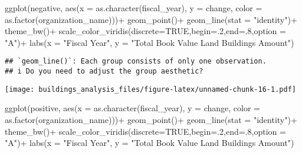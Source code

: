 \documentclass[
]{article}
\newenvironment{Shaded}{\begin{snugshade}}{\end{snugshade}}
\newcommand{\AttributeTok}[1]{\textcolor[rgb]{0.77,0.63,0.00}{#1}}
\newcommand{\ConstantTok}[1]{\textcolor[rgb]{0.00,0.00,0.00}{#1}}
\newcommand{\DecValTok}[1]{\textcolor[rgb]{0.00,0.00,0.81}{#1}}
\newcommand{\FunctionTok}[1]{\textcolor[rgb]{0.00,0.00,0.00}{#1}}
\newcommand{\NormalTok}[1]{#1}
\newcommand{\SpecialCharTok}[1]{\textcolor[rgb]{0.00,0.00,0.00}{#1}}
\newcommand{\StringTok}[1]{\textcolor[rgb]{0.31,0.60,0.02}{#1}}
\begin{document}
\begin{Shaded}
\begin{Highlighting}[]
  \FunctionTok{ggplot}\NormalTok{(negative, }\FunctionTok{aes}\NormalTok{(}\AttributeTok{x =} \FunctionTok{as.character}\NormalTok{(fiscal\_year), }\AttributeTok{y =}\NormalTok{ change, }\AttributeTok{color =} \FunctionTok{as.factor}\NormalTok{(organization\_name)))}\SpecialCharTok{+}
    \FunctionTok{geom\_point}\NormalTok{()}\SpecialCharTok{+}
    \FunctionTok{geom\_line}\NormalTok{(}\AttributeTok{stat =} \StringTok{"identity"}\NormalTok{)}\SpecialCharTok{+}
    \FunctionTok{theme\_bw}\NormalTok{()}\SpecialCharTok{+}
    \FunctionTok{scale\_color\_viridis}\NormalTok{(}\AttributeTok{discrete=}\ConstantTok{TRUE}\NormalTok{,}\AttributeTok{begin=}\NormalTok{.}\DecValTok{2}\NormalTok{,}\AttributeTok{end=}\NormalTok{.}\DecValTok{8}\NormalTok{,}\AttributeTok{option =} \StringTok{"A"}\NormalTok{)}\SpecialCharTok{+}
    \FunctionTok{labs}\NormalTok{(}\AttributeTok{x =} \StringTok{"Fiscal Year"}\NormalTok{, }\AttributeTok{y =} \StringTok{"Total Book Value Land Buildings Amount"}\NormalTok{)}
\end{Highlighting}
\end{Shaded}

\begin{verbatim}
## `geom_line()`: Each group consists of only one observation.
## i Do you need to adjust the group aesthetic?
\end{verbatim}

\texttt{[image: buildings\_analysis\_files/figure-latex/unnamed-chunk-16-1.pdf]}

\begin{Shaded}
\begin{Highlighting}[]
  \FunctionTok{ggplot}\NormalTok{(positive, }\FunctionTok{aes}\NormalTok{(}\AttributeTok{x =} \FunctionTok{as.character}\NormalTok{(fiscal\_year), }\AttributeTok{y =}\NormalTok{ change, }\AttributeTok{color =} \FunctionTok{as.factor}\NormalTok{(organization\_name)))}\SpecialCharTok{+}
    \FunctionTok{geom\_point}\NormalTok{()}\SpecialCharTok{+}
    \FunctionTok{geom\_line}\NormalTok{(}\AttributeTok{stat =} \StringTok{"identity"}\NormalTok{)}\SpecialCharTok{+}
    \FunctionTok{theme\_bw}\NormalTok{()}\SpecialCharTok{+}
    \FunctionTok{scale\_color\_viridis}\NormalTok{(}\AttributeTok{discrete=}\ConstantTok{TRUE}\NormalTok{,}\AttributeTok{begin=}\NormalTok{.}\DecValTok{2}\NormalTok{,}\AttributeTok{end=}\NormalTok{.}\DecValTok{8}\NormalTok{,}\AttributeTok{option =} \StringTok{"A"}\NormalTok{)}\SpecialCharTok{+}
    \FunctionTok{labs}\NormalTok{(}\AttributeTok{x =} \StringTok{"Fiscal Year"}\NormalTok{, }\AttributeTok{y =} \StringTok{"Total Book Value Land Buildings Amount"}\NormalTok{)}
\end{Highlighting}
\end{Shaded}
\end{document}
